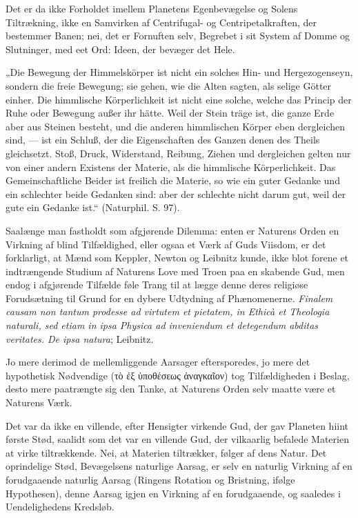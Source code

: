 \documentclass[12pt]{book}
\newcommand{\opage}[1]{\marginnote{\footnotesize\textit{[#1]}}}
\begin{document}
Det er da ikke Forholdet imellem Planetens Egenbevægelse og Solens Tiltrækning,
ikke en Samvirken af Centrifugal- og Centripetalkraften, der bestemmer Banen;
\opage{171} nei, det er Fornuften selv, Begrebet i sit System af Domme og Slutninger, med eet
Ord: Ideen, der bevæger det Hele.

„Die Bewegung der Himmelskörper ist nicht ein solches Hin- und Hergezogenseyn,
sondern die freie Bewegung; sie gehen, wie die Alten sagten, als selige Götter
einher. Die himmlische Körperlichkeit ist nicht eine solche, welche das Princip
der Ruhe oder Bewegung außer ihr hätte. Weil der Stein träge ist, die ganze Erde
aber aus Steinen besteht, und die anderen himmlischen Körper eben dergleichen
sind, --- ist ein Schluß, der die Eigenschaften des Ganzen denen des Theils
gleichsetzt. Stoß, Druck, Widerstand, Reibung, Ziehen und dergleichen gelten nur
von einer andern Existens der Materie, als die himmlische Körperlichkeit. Das
Gemeinschaftliche Beider ist freilich die Materie, so wie ein guter Gedanke und
ein schlechter beide Gedanken sind: aber der schlechte nicht darum gut, weil der
gute ein Gedanke ist.“ (Naturphil. S. 97).

Saalænge man fastholdt som afgjørende Dilemma: enten er Naturens Orden en
Virkning af blind Tilfældighed, eller ogsaa et Værk af Guds Viisdom, er det
forklarligt, at Mænd som Keppler, Newton og Leibnitz kunde, ikke blot forene et
indtrængende Studium af Naturens Love med Troen paa en skabende Gud, men endog i
afgjørende Tilfælde føle Trang til at lægge denne deres religiøse Forudsætning
til Grund for en dybere Udtydning af Phænomenerne. \textit{Finalem causam non
tantum prodesse ad virtutem et pietatem, in Ethicà et Theologia naturali, sed
etiam in ipsa Physica ad inveniendum et detegendum abditas veritates. De ipsa
natura}; Leibnitz.

Jo mere derimod de mellemliggende Aarsager eftersporedes, jo mere det
hypothetisk Nødvendige (τὸ ἐξ ὑποθέσεως ἀναγκαῖον) tog Tilfældigheden i Beslag,
desto mere paatrængte sig den Tanke, at Naturens Orden selv maatte være et
Naturens Værk.

\opage{172} Det var da ikke en villende, efter Hensigter virkende Gud, der gav Planeten hiint
første Stød, saalidt som det var en villende Gud, der vilkaarlig befalede
Materien at virke tiltrækkende. Nei, at Materien tiltrækker, følger af dens
Natur. Det oprindelige Stød, Bevægelsens naturlige Aarsag, er selv en naturlig
Virkning af en forudgaaende naturlig Aarsag (Ringens Rotation og Bristning,
ifølge Hypothesen), denne Aarsag igjen en Virkning af en forudgaaende, og
saaledes i Uendelighedens Kredsløb.
\end{document}
